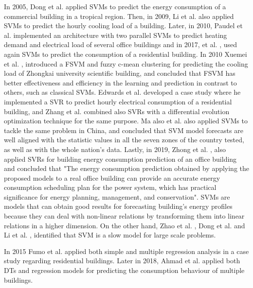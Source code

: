 In 2005, Dong et al. \cite{svm2} applied \ac{SVM}s to predict the energy consumption of a commercial building in a tropical region. Then, in 2009, Li et al. \cite{svmr1} also applied \ac{SVM}s to predict the hourly cooling load of a building. Later, in 2010, Paudel et al. \cite{svm3} implemented an architecture with two parallel \ac{SVM}s to predict heating demand and electrical load of several office buildings and in 2017, et al. \cite{svmr7}, used again \ac{SVM}s to predict the consumption of a residential building. In 2010 Xuemei et al. \cite{svmr2}, introduced a \ac{FSVM} and fuzzy c-mean clustering for predicting the cooling load of Zhongkai university scientific building, and concluded that \ac{FSVM} has better effectiveness and efficiency in the learning and prediction in contrast to others, such as classical \ac{SVM}s. Edwards et al. \cite{svmr3} developed a case study where he implemented a \ac{SVR} to predict hourly electrical consumption of a residential building, and Zhang et al. \cite{svmr4} combined also \ac{SVR}s with a differential evolution optimization technique for the same purpose. Ma also et al. \cite{svmr5} also applied \ac{SVM}s to tackle the same problem in China, and concluded that \ac{SVM} model forecasts are well aligned with the statistic values in all the seven zones of the country tested, as well as with the whole nation's data. Lastly, in 2019, Zhong et al. \cite{svmr6}, also applied \ac{SVR}s for building energy consumption prediction of an office building and concluded that "The energy consumption prediction obtained by applying the proposed models to a real office building can provide an accurate energy consumption scheduling plan for the power system, which has practical significance for energy planning, management, and conservation". \ac{SVM}s are models that can obtain good results for forecasting building's energy profiles because they can deal with non-linear relations by transforming them into linear relations in a higher dimension. On the other hand, Zhao et al. \cite{svm3}, Dong et al. \cite{svm2} and Li et al. \cite{svm5}, identified that \ac{SVM} is a slow model for large scale problems.
 
In 2015 Fumo et al. \cite{regression0} applied both simple and multiple regression analysis in a case study regarding residential buildings. Later in 2018, Ahmad et al. \cite{dt0} applied both DTs and regression models for predicting the consumption behaviour of multiple buildings.

